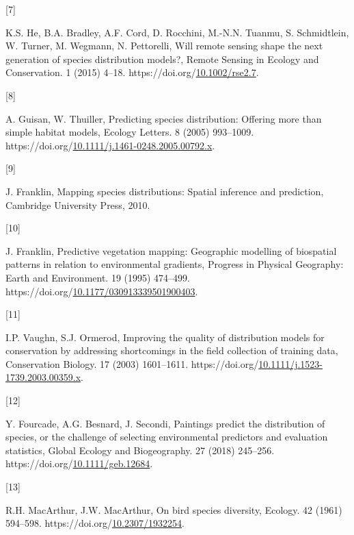 \documentclass[manuscript, 3p, authoryear]{elsarticle} %
\newlength{\cslhangindent}
\newlength{\csllabelwidth}
\newlength{\cslentryspacingunit} %
\newenvironment{CSLReferences}[2] %
 {%
  \setlength{\parindent}{0pt}
  \ifodd #1
  \let\oldpar\par
  \def\par{\hangindent=\cslhangindent\oldpar}
  \fi
  \setlength{\parskip}{#2\cslentryspacingunit}
 }%
 {}
\newcommand{\CSLLeftMargin}[1]{\parbox[t]{\csllabelwidth}{#1}}
\newcommand{\CSLRightInline}[1]{\parbox[t]{\linewidth - \csllabelwidth}{#1}\break}
\begin{document}
\begin{CSLReferences}{0}{0}
\leavevmode{}%
\CSLLeftMargin{{[}7{]} }%
\CSLRightInline{K.S. He, B.A. Bradley, A.F. Cord, D. Rocchini, M.-N.N. Tuanmu, S. Schmidtlein, W. Turner, M. Wegmann, N. Pettorelli, Will remote sensing shape the next generation of species distribution models?, Remote Sensing in Ecology and Conservation. 1 (2015) 4--18. https://doi.org/\href{https://doi.org/10.1002/rse2.7}{10.1002/rse2.7}.}

\leavevmode{}%
\CSLLeftMargin{{[}8{]} }%
\CSLRightInline{A. Guisan, W. Thuiller, Predicting species distribution: Offering more than simple habitat models, Ecology Letters. 8 (2005) 993--1009. https://doi.org/\href{https://doi.org/10.1111/j.1461-0248.2005.00792.x}{10.1111/j.1461-0248.2005.00792.x}.}

\leavevmode{}%
\CSLLeftMargin{{[}9{]} }%
\CSLRightInline{J. Franklin, Mapping species distributions: Spatial inference and prediction, {Cambridge University Press}, 2010.}

\leavevmode{}%
\CSLLeftMargin{{[}10{]} }%
\CSLRightInline{J. Franklin, Predictive vegetation mapping: Geographic modelling of biospatial patterns in relation to environmental gradients, Progress in Physical Geography: Earth and Environment. 19 (1995) 474--499. https://doi.org/\href{https://doi.org/10.1177/030913339501900403}{10.1177/030913339501900403}.}

\leavevmode{}%
\CSLLeftMargin{{[}11{]} }%
\CSLRightInline{I.P. Vaughn, S.J. Ormerod, Improving the quality of distribution models for conservation by addressing shortcomings in the field collection of training data, Conservation Biology. 17 (2003) 1601--1611. https://doi.org/\href{https://doi.org/10.1111/j.1523-1739.2003.00359.x}{10.1111/j.1523-1739.2003.00359.x}.}

\leavevmode{}%
\CSLLeftMargin{{[}12{]} }%
\CSLRightInline{Y. Fourcade, A.G. Besnard, J. Secondi, Paintings predict the distribution of species, or the challenge of selecting environmental predictors and evaluation statistics, Global Ecology and Biogeography. 27 (2018) 245--256. https://doi.org/\href{https://doi.org/10.1111/geb.12684}{10.1111/geb.12684}.}

\leavevmode{}%
\CSLLeftMargin{{[}13{]} }%
\CSLRightInline{R.H. MacArthur, J.W. MacArthur, On bird species diversity, Ecology. 42 (1961) 594--598. https://doi.org/\href{https://doi.org/10.2307/1932254}{10.2307/1932254}.}


\end{CSLReferences}
\end{document}
